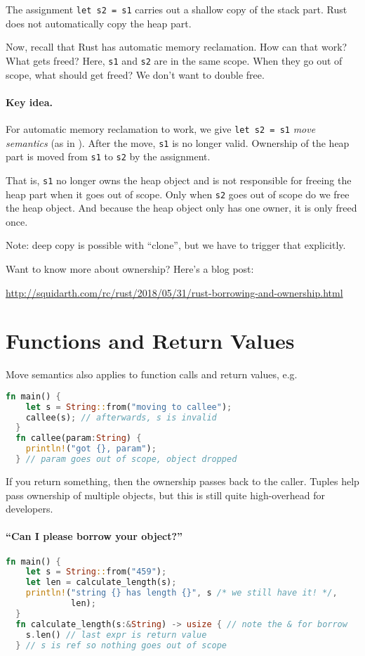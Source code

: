 The assignment {\tt let s2 = s1} carries out a shallow copy of the stack part. Rust
does not automatically copy the heap part.

Now, recall that Rust has automatic memory reclamation. How can that
work? What gets freed?  Here, {\tt s1} and {\tt s2} are in the same
scope. When they go out of scope, what should get freed? We
don't want to double free.

\paragraph{Key idea.} For automatic memory reclamation to work, we give {\tt let s2 = s1} \emph{move semantics}
(as in \CPP). After the move, {\tt s1} is no longer valid.
Ownership of the heap part is moved from {\tt s1} to {\tt s2} by the assignment.

That is, {\tt s1} no longer owns the heap object and is not responsible for freeing the heap part
when it goes out of scope. Only when {\tt s2} goes out of scope do we free the heap object.
And because the heap object only has one owner, it is only freed once.

Note: deep copy is possible with ``clone'', but we have to trigger that explicitly.

Want to know more about ownership? Here's a blog post:
\begin{center}
  \url{http://squidarth.com/rc/rust/2018/05/31/rust-borrowing-and-ownership.html}
\end{center}
\section*{Functions and Return Values}

Move semantics also applies to function calls and return values, e.g.
\begin{lstlisting}[language=Rust]
  fn main() {
    let s = String::from("moving to callee");
    callee(s); // afterwards, s is invalid
  }
  fn callee(param:String) {
    println!("got {}, param");
  } // param goes out of scope, object dropped
\end{lstlisting}
If you return something, then the ownership passes back to the caller.
Tuples help pass ownership of multiple objects, but this is still quite
high-overhead for developers.

\paragraph{``Can I please borrow your object?''}
\begin{lstlisting}[language=Rust]
  fn main() {
    let s = String::from("459");
    let len = calculate_length(s);
    println!("string {} has length {}", s /* we still have it! */,
             len);
  }
  fn calculate_length(s:&String) -> usize { // note the & for borrow
    s.len() // last expr is return value
  } // s is ref so nothing goes out of scope
\end{lstlisting}
  

